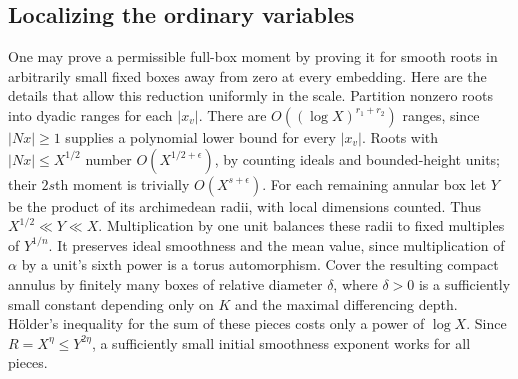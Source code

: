 \documentclass[11pt,reqno]{amsart}
\numberwithin{equation}{section}
\theoremstyle{definition}
\begin{document}
\subsection{Localizing the ordinary variables}

One may prove a permissible full-box moment by proving it for smooth roots in
arbitrarily small fixed boxes away from zero at every embedding.  Here are the
details that allow this reduction uniformly in the scale.
Partition nonzero roots into dyadic ranges for each $|x_v|$.  There are
$O((\log X)^{r_1+r_2})$ ranges, since $|Nx|\ge1$ supplies a polynomial lower
bound for every $|x_v|$.  Roots with $|Nx|\le X^{1/2}$ number
$O(X^{1/2+\epsilon})$, by counting ideals and bounded-height units; their
$2s$th moment is trivially $O(X^{s+\epsilon})$.
For each remaining annular box let $Y$ be the product of its archimedean radii,
with local dimensions counted.  Thus $X^{1/2}\ll Y\ll X$.
Multiplication by one unit balances these radii to fixed multiples of $Y^{1/n}$.
It preserves ideal smoothness and the mean value, since multiplication of
$\alpha$ by a unit's sixth power is a torus automorphism.
Cover the resulting compact annulus by finitely many boxes of relative diameter
$\delta$, where $\delta>0$ is a sufficiently small constant depending only on
$K$ and the maximal differencing depth.  H\"older's inequality for the sum of
these pieces costs only a power of $\log X$.  Since $R=X^\eta\le Y^{2\eta}$,
a sufficiently small initial smoothness exponent works for all pieces.
\end{document}

